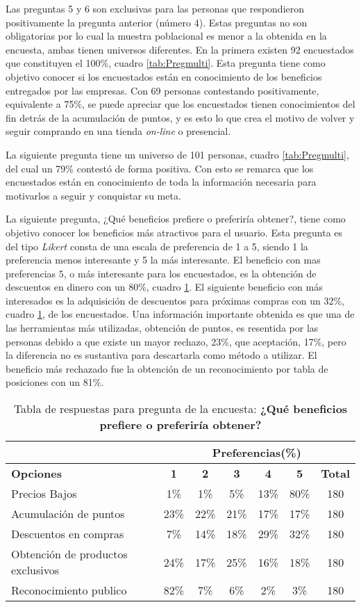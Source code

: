 Las preguntas 5 y 6 son exclusivas para las personas que respondieron positivamente
la pregunta anterior (número 4).
Estas preguntas no son obligatorias por lo cual la muestra poblacional
es menor a la obtenida en la encuesta, ambas tienen universos diferentes.
En la primera existen $92$ encuestados que constituyen el 100\%, cuadro \ref{tab:Pregmulti}.
Esta pregunta tiene como objetivo conocer si los encuestados están en conocimiento
de los beneficios entregados por las empresas.
Con 69 personas contestando positivamente, equivalente a 75\%, se puede apreciar
que los encuestados tienen conocimientos del fin detrás de la acumulación de puntos,
y es esto lo que crea el motivo de volver y seguir comprando en una tienda
\emph{on-line} o presencial.

La siguiente pregunta tiene un universo de 101 personas, cuadro \ref{tab:Pregmulti},
del cual un 79\% contestó de forma positiva.
Con esto se remarca que los encuestados están en conocimiento de toda la
información necesaria para motivarlos a seguir y conquistar su meta.

La siguiente pregunta,
¿Qué beneficios prefiere o preferiría obtener?,
tiene como objetivo conocer los  beneficios más atractivos para el usuario.
Esta pregunta es del tipo \emph{Likert} \cite{likert} consta de una escala de preferencia de
1 a 5, siendo 1 la preferencia menos interesante y 5 la más interesante.
El beneficio con mas preferencias $5$, o más interesante para los encuestados,
es la obtención de descuentos en dinero con un 80\%, cuadro \ref{tab:Preg7}.
El siguiente beneficio con más interesados es la adquisición de descuentos para
próximas compras con un 32\%, cuadro \ref{tab:Preg7}, de los encuestados.
Una información importante obtenida es que una de las herramientas más utilizadas,
obtención de puntos, es resentida por las personas debido a que existe un mayor
rechazo, 23\%, que aceptación, 17\%, pero la diferencia no es sustantiva para
descartarla como método a utilizar.
El beneficio más rechazado fue la obtención de un
reconocimiento por tabla de posiciones con un 81\%.

\begin{table}[h]
\centering
\footnotesize
\begin{tabular}{|l|c|c|c|c|c|c|}
\hline
 & \multicolumn{6}{c|}{{\bf Preferencias(\%)}} \\
\hline
{\bf Opciones} & {\bf 1} & {\bf 2} & {\bf 3} & {\bf 4} & {\bf 5} & {\bf Total}\\
\hline
Precios Bajos & 1\% & 1\% & 5\% & 13\% & 80\% & 180\\
\hline
Acumulación de puntos & 23\% & 22\% & 21\% & 17\% & 17\% & 180\\
\hline
Descuentos en compras & 7\% & 14\% & 18\% & 29\% & 32\% & 180\\
\hline
Obtención de productos exclusivos & 24\% & 17\% & 25\% & 16\% & 18\% & 180\\
\hline
Reconocimiento publico & 82\% & 7\% & 6\% & 2\% & 3\% & 180\\
\hline
\end{tabular}
\caption{Tabla de respuestas para pregunta de la encuesta: {\bf ¿Qué beneficios prefiere o preferiría obtener?}}
\label{tab:Preg7}
\end{table}

